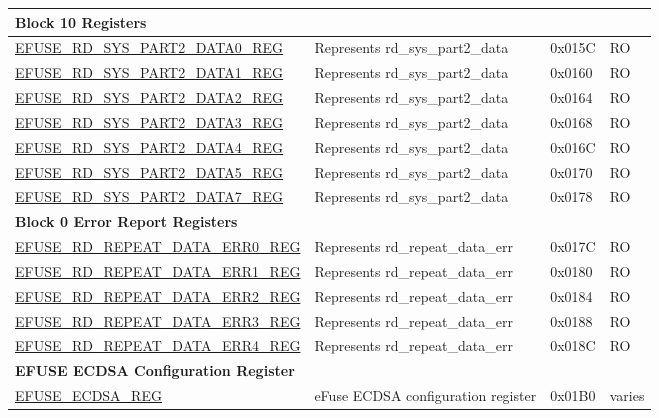 \begin{longtable}{ | p{7cm} | p{6cm} | p{1.2cm} | p{1.5cm} | }
\multicolumn{4}{|l|}{\textbf{Block 10 Registers}} \\ \hline
\hyperref[regdesc:EFUSERDSYSPART2DATANREG]{EFUSE\_RD\_SYS\_PART2\_DATA0\_REG} & Represents rd\_sys\_part2\_data & 0x015C & RO \\ \hline
\hyperref[regdesc:EFUSERDSYSPART2DATANREG]{EFUSE\_RD\_SYS\_PART2\_DATA1\_REG} & Represents rd\_sys\_part2\_data & 0x0160 & RO \\ \hline
\hyperref[regdesc:EFUSERDSYSPART2DATANREG]{EFUSE\_RD\_SYS\_PART2\_DATA2\_REG} & Represents rd\_sys\_part2\_data & 0x0164 & RO \\ \hline
\hyperref[regdesc:EFUSERDSYSPART2DATANREG]{EFUSE\_RD\_SYS\_PART2\_DATA3\_REG} & Represents rd\_sys\_part2\_data & 0x0168 & RO \\ \hline
\hyperref[regdesc:EFUSERDSYSPART2DATANREG]{EFUSE\_RD\_SYS\_PART2\_DATA4\_REG} & Represents rd\_sys\_part2\_data & 0x016C & RO \\ \hline
\hyperref[regdesc:EFUSERDSYSPART2DATANREG]{EFUSE\_RD\_SYS\_PART2\_DATA5\_REG} & Represents rd\_sys\_part2\_data & 0x0170 & RO \\ \hline
\hyperref[regdesc:EFUSERDSYSPART2DATA7REG]{EFUSE\_RD\_SYS\_PART2\_DATA7\_REG} & Represents rd\_sys\_part2\_data & 0x0178 & RO \\ \hline
\multicolumn{4}{|l|}{\textbf{Block 0 Error Report Registers}} \\ \hline
\hyperref[regdesc:EFUSERDREPEATDATAERR0REG]{EFUSE\_RD\_REPEAT\_DATA\_ERR0\_REG} & Represents rd\_repeat\_data\_err & 0x017C & RO \\ \hline
\hyperref[regdesc:EFUSERDREPEATDATAERR1REG]{EFUSE\_RD\_REPEAT\_DATA\_ERR1\_REG} & Represents rd\_repeat\_data\_err & 0x0180 & RO \\ \hline
\hyperref[regdesc:EFUSERDREPEATDATAERR2REG]{EFUSE\_RD\_REPEAT\_DATA\_ERR2\_REG} & Represents rd\_repeat\_data\_err & 0x0184 & RO \\ \hline
\hyperref[regdesc:EFUSERDREPEATDATAERR3REG]{EFUSE\_RD\_REPEAT\_DATA\_ERR3\_REG} & Represents rd\_repeat\_data\_err & 0x0188 & RO \\ \hline
\hyperref[regdesc:EFUSERDREPEATDATAERR4REG]{EFUSE\_RD\_REPEAT\_DATA\_ERR4\_REG} & Represents rd\_repeat\_data\_err & 0x018C & RO \\ \hline
\multicolumn{4}{|l|}{\textbf{EFUSE ECDSA Configuration Register}} \\ \hline
\hyperref[regdesc:EFUSEECDSAREG]{EFUSE\_ECDSA\_REG} & eFuse ECDSA configuration register & 0x01B0 & varies \\ \hline

\end{longtable}
